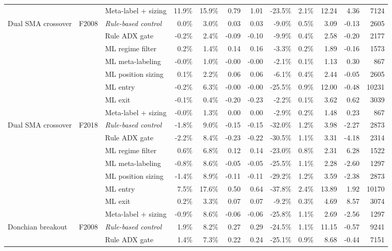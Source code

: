 \begin{longtable}{p{2.2cm} l p{2.6cm} r r r r r r r r r}
 &  & Meta-label + sizing & 11.9\% & 15.9\% & 0.79 & 1.01 & -23.5\% & 2.1\% & 12.24 & 4.36 & 7124 \\
Dual SMA crossover & F2008 & \textit{Rule-based control} & 0.0\% & 3.0\% & 0.03 & 0.03 & -9.0\% & 0.5\% & 3.09 & -0.13 & 2605 \\
 &  & Rule ADX gate & -0.2\% & 2.4\% & -0.09 & -0.10 & -9.9\% & 0.4\% & 2.58 & -0.20 & 2177 \\
 &  & ML regime filter & 0.2\% & 1.4\% & 0.14 & 0.16 & -3.3\% & 0.2\% & 1.89 & -0.16 & 1573 \\
 &  & ML meta-labeling & -0.0\% & 1.0\% & -0.00 & -0.00 & -2.1\% & 0.1\% & 1.13 & 0.30 & 867 \\
 &  & ML position sizing & 0.1\% & 2.2\% & 0.06 & 0.06 & -6.1\% & 0.4\% & 2.44 & -0.05 & 2605 \\
 &  & ML entry & -0.2\% & 6.3\% & -0.00 & -0.00 & -25.5\% & 0.9\% & 12.00 & -0.48 & 10231 \\
 &  & ML exit & -0.1\% & 0.4\% & -0.20 & -0.23 & -2.2\% & 0.1\% & 3.62 & 0.62 & 3039 \\
 &  & Meta-label + sizing & -0.0\% & 1.3\% & 0.00 & 0.00 & -2.9\% & 0.2\% & 1.48 & 0.23 & 867 \\
Dual SMA crossover & F2018 & \textit{Rule-based control} & -1.8\% & 9.0\% & -0.15 & -0.15 & -32.0\% & 1.2\% & 3.98 & -2.27 & 2873 \\
 &  & Rule ADX gate & -2.2\% & 8.4\% & -0.23 & -0.22 & -30.5\% & 1.1\% & 3.31 & -4.18 & 2314 \\
 &  & ML regime filter & 0.6\% & 6.8\% & 0.12 & 0.14 & -23.0\% & 0.8\% & 2.31 & 6.28 & 1522 \\
 &  & ML meta-labeling & -0.8\% & 8.6\% & -0.05 & -0.05 & -25.5\% & 1.1\% & 2.28 & -2.60 & 1297 \\
 &  & ML position sizing & -1.4\% & 8.9\% & -0.11 & -0.11 & -29.2\% & 1.2\% & 3.59 & -2.38 & 2873 \\
 &  & ML entry & 7.5\% & 17.6\% & 0.50 & 0.64 & -37.8\% & 2.4\% & 13.89 & 1.92 & 10170 \\
 &  & ML exit & 0.2\% & 3.3\% & 0.07 & 0.07 & -9.2\% & 0.3\% & 4.69 & 8.57 & 3074 \\
 &  & Meta-label + sizing & -0.9\% & 8.6\% & -0.06 & -0.06 & -25.8\% & 1.1\% & 2.69 & -2.56 & 1297 \\
Donchian breakout & F2008 & \textit{Rule-based control} & 1.9\% & 8.2\% & 0.27 & 0.29 & -24.5\% & 1.1\% & 11.15 & -0.57 & 9241 \\
 &  & Rule ADX gate & 1.4\% & 7.3\% & 0.22 & 0.24 & -25.1\% & 0.9\% & 8.68 & -0.44 & 7151 \\

\end{longtable}
